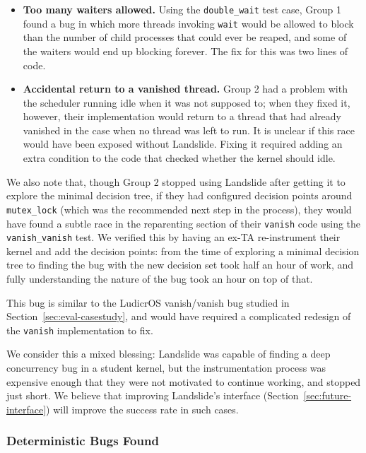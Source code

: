 \begin{itemize}
	\item {\bf Too many waiters allowed.} Using the \texttt{double\_wait} test case, Group 1 found a bug in which more threads invoking \texttt{wait} would be allowed to block than the number of child processes that could ever be reaped, and some of the waiters would end up blocking forever. The fix for this was two lines of code. 
	\item {\bf Accidental return to a vanished thread.} Group 2 had a problem with the scheduler running idle when it was not supposed to; when they fixed it, however, their implementation would return to a thread that had already vanished in the case when no thread was left to run. It is unclear if this race would have been exposed without Landslide. Fixing it required adding an extra condition to the code that checked whether the kernel should idle.
\end{itemize}

We also note that, though Group 2 stopped using Landslide after getting it to explore the minimal decision tree, if they had configured decision points around \texttt{mutex\_lock} (which was the recommended next step in the process), they would have found a subtle race in the reparenting section of their \texttt{vanish} code using the \texttt{vanish\_vanish} test. We verified this by having an ex-TA re-instrument their kernel and add the decision points: from the time of exploring a minimal decision tree to finding the bug with the new decision set took half an hour of work, and fully understanding the nature of the bug took an hour on top of that.

This bug is similar to the LudicrOS vanish/vanish bug studied in Section~\ref{sec:eval-casestudy}, and would have required a complicated redesign of the \texttt{vanish} implementation to fix.

We consider this a mixed blessing: Landslide was capable of finding a deep concurrency bug in a student kernel, but the instrumentation process was expensive enough that they were not motivated to continue working, and stopped just short. We believe that improving Landslide's interface (Section~\ref{sec:future-interface}) will improve the success rate in such cases.

\subsubsection{Deterministic Bugs Found}

